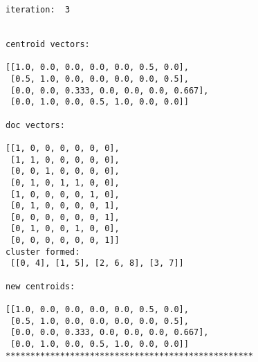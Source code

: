 \documentclass[11pt]{article}
\begin{document}
\begin{Verbatim}[commandchars=\\\{\}]
iteration:  3 


centroid vectors:

[[1.0, 0.0, 0.0, 0.0, 0.0, 0.5, 0.0],
 [0.5, 1.0, 0.0, 0.0, 0.0, 0.0, 0.5],
 [0.0, 0.0, 0.333, 0.0, 0.0, 0.0, 0.667],
 [0.0, 1.0, 0.0, 0.5, 1.0, 0.0, 0.0]]

doc vectors:

[[1, 0, 0, 0, 0, 0, 0],
 [1, 1, 0, 0, 0, 0, 0],
 [0, 0, 1, 0, 0, 0, 0],
 [0, 1, 0, 1, 1, 0, 0],
 [1, 0, 0, 0, 0, 1, 0],
 [0, 1, 0, 0, 0, 0, 1],
 [0, 0, 0, 0, 0, 0, 1],
 [0, 1, 0, 0, 1, 0, 0],
 [0, 0, 0, 0, 0, 0, 1]]
cluster formed:
 [[0, 4], [1, 5], [2, 6, 8], [3, 7]]

new centroids:

[[1.0, 0.0, 0.0, 0.0, 0.0, 0.5, 0.0],
 [0.5, 1.0, 0.0, 0.0, 0.0, 0.0, 0.5],
 [0.0, 0.0, 0.333, 0.0, 0.0, 0.0, 0.667],
 [0.0, 1.0, 0.0, 0.5, 1.0, 0.0, 0.0]]
**************************************************

    \end{Verbatim}
\end{document}
